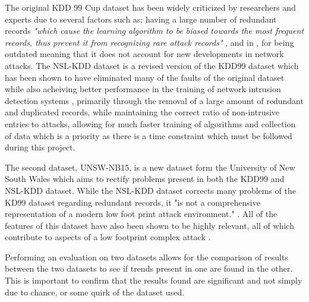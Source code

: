 	The original KDD 99 Cup dataset has been widely criticized by researchers and experts due to several factors such as; having a large number of redundant records \textit{"which  cause  the  learning  algorithm  to  be  biased  towards  the  most  frequent  records,  thus  prevent  it  from  recognizing  rare  attack  records"} \cite{panda2012hybrid} , and in \cite{vasudevan2011ssenet}, for being outdated meaning that it does not account for new developments in network attacks. The NSL-KDD dataset is a revised version of the KDD99 dataset which has been shown to have eliminated many of the faults of the original dataset while also acheiving better performance in the training of network intrusion detection systems \cite{dhanabal2015study}, primarily through the removal of a large amount of redundant and duplicated records, while maintaining the correct ratio of non-intrusive entries to attacks, allowing for much faster training of algorithms and collection of data which is a priority as there is a time constraint which must be followed during this project.
	
	The second dataset, UNSW-NB15, is a new dataset form the University of New South Wales which aims to rectify problems present in both the KDD99 and NSL-KDD dataset. While the NSL-KDD dataset corrects many problems of the KD99 dataset regarding redundant records, it "is not a comprehensive representation of a modern low foot print attack environment." \cite{moustafa2015unsw}. All of the features of this dataset have also been shown to be highly relevant, all of which contribute to aspects of a low footprint complex attack \cite{moustafa2016evaluation}. 

	Performing an evaluation on two datasets allows for the comparison of results between the two datasets to see if trends present in one are found in the other. This is important to confirm that the results found are significant and not simply due to chance, or some quirk of the dataset used.
	
